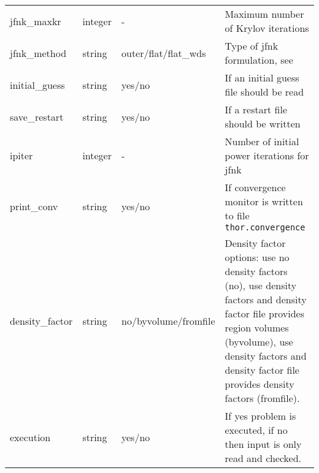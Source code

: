 \begin{table}[p]
\begin{tabular}{l l l l}
            jfnk\_maxkr &integer & - & Maximum number of Krylov iterations\\
            jfnk\_method & string & outer/flat/flat\_wds & Type of jfnk formulation, see~\cite{}\\
            initial\_guess & string & yes/no & If an initial guess file should be read\\
            save\_restart & string & yes/no & If a restart file should be written \\
            ipiter & integer & - & Number of initial power iterations for jfnk\\
            print\_conv & string & yes/no & If convergence monitor is written to file \verb"thor.convergence"\\
            density\_factor & string & no/byvolume/fromfile  & Density factor options: use no density factors (no), use density factors and density factor file provides region volumes (byvolume), use density factors and density factor file provides density factors (fromfile). \\
            execution & string & yes/no & If yes problem is executed, if no then input is only read and checked.\\
        \bottomrule
    \end{tabular}
\end{table}

